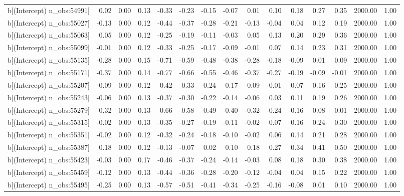 \begin{table}[ht]
\begin{tabular}{rrrrrrrrrrrrrrr}
  b[(Intercept) n\_obs:54991] & 0.02 & 0.00 & 0.13 & -0.33 & -0.23 & -0.15 & -0.07 & 0.01 & 0.10 & 0.18 & 0.27 & 0.35 & 2000.00 & 1.00 \\ 
  b[(Intercept) n\_obs:55027] & -0.13 & 0.00 & 0.12 & -0.44 & -0.37 & -0.28 & -0.21 & -0.13 & -0.04 & 0.04 & 0.12 & 0.19 & 2000.00 & 1.00 \\ 
  b[(Intercept) n\_obs:55063] & 0.05 & 0.00 & 0.12 & -0.25 & -0.19 & -0.11 & -0.03 & 0.05 & 0.13 & 0.20 & 0.29 & 0.36 & 2000.00 & 1.00 \\ 
  b[(Intercept) n\_obs:55099] & -0.01 & 0.00 & 0.12 & -0.33 & -0.25 & -0.17 & -0.09 & -0.01 & 0.07 & 0.14 & 0.23 & 0.31 & 2000.00 & 1.00 \\ 
  b[(Intercept) n\_obs:55135] & -0.28 & 0.00 & 0.15 & -0.71 & -0.59 & -0.48 & -0.38 & -0.28 & -0.18 & -0.09 & 0.01 & 0.09 & 2000.00 & 1.00 \\ 
  b[(Intercept) n\_obs:55171] & -0.37 & 0.00 & 0.14 & -0.77 & -0.66 & -0.55 & -0.46 & -0.37 & -0.27 & -0.19 & -0.09 & -0.01 & 2000.00 & 1.00 \\ 
  b[(Intercept) n\_obs:55207] & -0.09 & 0.00 & 0.12 & -0.42 & -0.33 & -0.24 & -0.17 & -0.09 & -0.01 & 0.07 & 0.16 & 0.25 & 2000.00 & 1.00 \\ 
  b[(Intercept) n\_obs:55243] & -0.06 & 0.00 & 0.13 & -0.37 & -0.30 & -0.22 & -0.14 & -0.06 & 0.03 & 0.11 & 0.19 & 0.26 & 2000.00 & 1.00 \\ 
  b[(Intercept) n\_obs:55279] & -0.32 & 0.00 & 0.13 & -0.66 & -0.58 & -0.49 & -0.40 & -0.32 & -0.24 & -0.16 & -0.08 & 0.01 & 2000.00 & 1.00 \\ 
  b[(Intercept) n\_obs:55315] & -0.02 & 0.00 & 0.13 & -0.35 & -0.27 & -0.19 & -0.11 & -0.02 & 0.07 & 0.16 & 0.24 & 0.30 & 2000.00 & 1.00 \\ 
  b[(Intercept) n\_obs:55351] & -0.02 & 0.00 & 0.12 & -0.32 & -0.24 & -0.18 & -0.10 & -0.02 & 0.06 & 0.14 & 0.21 & 0.28 & 2000.00 & 1.00 \\ 
  b[(Intercept) n\_obs:55387] & 0.18 & 0.00 & 0.12 & -0.13 & -0.07 & 0.02 & 0.10 & 0.18 & 0.27 & 0.34 & 0.41 & 0.50 & 2000.00 & 1.00 \\ 
  b[(Intercept) n\_obs:55423] & -0.03 & 0.00 & 0.17 & -0.46 & -0.37 & -0.24 & -0.14 & -0.03 & 0.08 & 0.18 & 0.30 & 0.38 & 2000.00 & 1.00 \\ 
  b[(Intercept) n\_obs:55459] & -0.12 & 0.00 & 0.13 & -0.44 & -0.36 & -0.28 & -0.20 & -0.12 & -0.04 & 0.04 & 0.15 & 0.22 & 2000.00 & 1.00 \\ 
  b[(Intercept) n\_obs:55495] & -0.25 & 0.00 & 0.13 & -0.57 & -0.51 & -0.41 & -0.34 & -0.25 & -0.16 & -0.08 & 0.01 & 0.10 & 2000.00 & 1.00 \\ 

\end{tabular}
\end{table}
